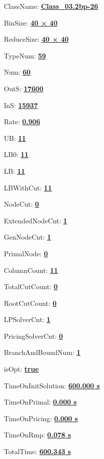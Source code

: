 \documentclass[11pt]{article}
\begin{document}
\pagestyle{empty}


ClassName: \underline{\textbf{Class_03.2bp-26}}
\par
BinSize: \underline{\textbf{40 × 40}}
\par
ReduceSize: \underline{\textbf{40 × 40}}
\par
TypeNum: \underline{\textbf{59}}
\par
Num: \underline{\textbf{60}}
\par
OutS: \underline{\textbf{17600}}
\par
InS: \underline{\textbf{15937}}
\par
Rate: \underline{\textbf{0.906}}
\par
UB: \underline{\textbf{11}}
\par
LB0: \underline{\textbf{11}}
\par
LB: \underline{\textbf{11}}
\par
LBWithCut: \underline{\textbf{11}}
\par
NodeCut: \underline{\textbf{0}}
\par
ExtendedNodeCnt: \underline{\textbf{1}}
\par
GenNodeCnt: \underline{\textbf{1}}
\par
PrimalNode: \underline{\textbf{0}}
\par
ColumnCount: \underline{\textbf{11}}
\par
TotalCutCount: \underline{\textbf{0}}
\par
RootCutCount: \underline{\textbf{0}}
\par
LPSolverCnt: \underline{\textbf{1}}
\par
PricingSolverCnt: \underline{\textbf{0}}
\par
BranchAndBoundNum: \underline{\textbf{1}}
\par
isOpt: \underline{\textbf{true}}
\par
TimeOnInitSolution: \underline{\textbf{600.000 s}}
\par
TimeOnPrimal: \underline{\textbf{0.000 s}}
\par
TimeOnPricing: \underline{\textbf{0.000 s}}
\par
TimeOnRmp: \underline{\textbf{0.078 s}}
\par
TotalTime: \underline{\textbf{600.343 s}}
\par
\newpage


\end{document}
